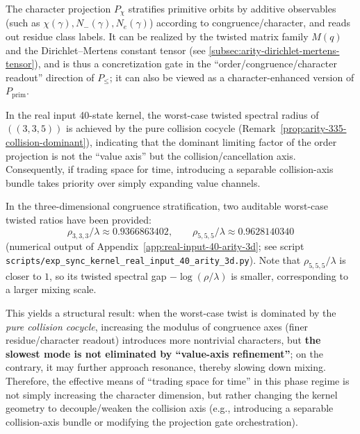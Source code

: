 \begin{definition}\label{def:pom-proj-chi}
The character projection $P_\chi$ stratifies primitive orbits by additive observables (such as $\chi(\gamma),N_-(\gamma),N_e(\gamma)$) according to congruence/character, and reads out residue class labels. It can be realized by the twisted matrix family $M(q)$ and the Dirichlet--Mertens constant tensor (see \ref{subsec:arity-dirichlet-mertens-tensor}), and is thus a concretization gate in the ``order/congruence/character readout'' direction of $P_{\le}$; it can also be viewed as a character-enhanced version of $P_{\mathrm{prim}}$.
\end{definition}

\begin{remark}\label{rem:pom-collision-axis}
In the real input 40-state kernel, the worst-case twisted spectral radius of \(((3,3,5))\) is achieved by the pure collision cocycle (Remark~\ref{prop:arity-335-collision-dominant}), indicating that the dominant limiting factor of the order projection is not the ``value axis'' but the collision/cancellation axis. Consequently, if trading space for time, introducing a separable collision-axis bundle takes priority over simply expanding value channels.
\end{remark}

\begin{remark}\label{rem:pom-more-axis-slower}
In the three-dimensional congruence stratification, two auditable worst-case twisted ratios have been provided:
\[
\rho_{3,3,3}/\lambda\approx 0.9366863402,
\qquad
\rho_{5,5,5}/\lambda\approx 0.9628140340
\]
(numerical output of Appendix~\ref{app:real-input-40-arity-3d}; see script \texttt{scripts/exp\_sync\_kernel\_real\_input\_40\_arity\_3d.py}).
Note that \(\rho_{5,5,5}/\lambda\) is closer to \(1\), so its twisted spectral gap \(-\log(\rho/\lambda)\) is smaller, corresponding to a larger mixing scale.

This yields a structural result: when the worst-case twist is dominated by the \emph{pure collision cocycle}, increasing the modulus of congruence axes (finer residue/character readout) introduces more nontrivial characters, but \textbf{the slowest mode is not eliminated by ``value-axis refinement''}; on the contrary, it may further approach resonance, thereby slowing down mixing.
Therefore, the effective means of ``trading space for time'' in this phase regime is not simply increasing the character dimension, but rather changing the kernel geometry to decouple/weaken the collision axis (e.g., introducing a separable collision-axis bundle or modifying the projection gate orchestration).
\end{remark}

